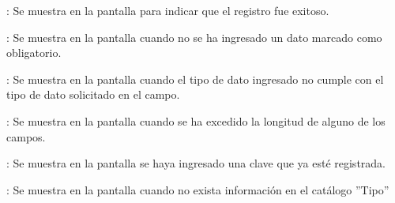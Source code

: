 \begin{Citemize}
	\item {}: Se muestra en la pantalla  para indicar que el registro fue exitoso.
	\item {}: Se muestra en la pantalla  cuando no se ha ingresado un dato marcado como obligatorio.
	\item {}: Se muestra en la pantalla  cuando el tipo de dato ingresado no cumple con el tipo de dato solicitado en el campo.
	\item {}: Se muestra en la pantalla  cuando se ha excedido la longitud de alguno de los campos.
	\item {}: Se muestra en la pantalla  se haya ingresado una clave que ya esté registrada.
	\item {}: Se muestra en la pantalla  cuando no exista información en el catálogo ''Tipo''
\end{Citemize}
